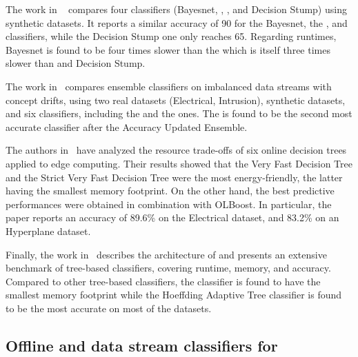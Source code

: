 The work in ~\cite{kaur2020} compares four classifiers (Bayesnet,
\hoeffdingtree, \naivebayes, and Decision Stump) using synthetic datasets.  It
reports a similar accuracy of 90 for the Bayesnet, the \hoeffdingtree, and
\naivebayes classifiers, while the Decision Stump one only reaches 65. Regarding
runtimes, Bayesnet is found to be four times slower than the \hoeffdingtree
which is itself three times slower than \naivebayes and Decision Stump.

The work in~\cite{priya2020comprehensive} compares ensemble classifiers on
imbalanced data streams with concept drifts, using two real datasets
(Electrical, Intrusion), synthetic datasets, and six classifiers, including the
\naivebayes and the \hoeffdingtree ones. The \hoeffdingtree is found to be the
second most accurate classifier after the Accuracy Updated Ensemble.

The authors in~\cite{lopes2020evaluating} have analyzed the resource trade-offs
of six online decision trees applied to edge computing. Their results showed
that the Very Fast Decision Tree and the Strict Very Fast Decision Tree were the
most energy-friendly, the latter having the smallest memory footprint. On the
other hand, the best predictive performances were obtained in combination with
OLBoost. In particular, the paper reports an accuracy of 89.6\% on the
Electrical dataset, and 83.2\% on an Hyperplane dataset.

Finally, the work in~\cite{StreamDM-CPP} describes the architecture of
\streamdmcpp and presents an extensive benchmark of tree-based classifiers,
covering runtime, memory, and accuracy. Compared to other tree-based
classifiers, the \hoeffdingtree classifier is found to have the smallest memory
footprint while the Hoeffding Adaptive Tree classifier is found to be the most
accurate on most of the datasets. 

\subsection{Offline and data stream classifiers for \har}

